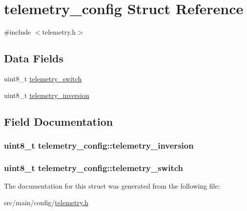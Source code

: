 \hypertarget{structtelemetry__config}{\section{telemetry\+\_\+config Struct Reference}
\label{structtelemetry__config}
}


{\ttfamily \#include $<$telemetry.\+h$>$}

\subsection*{Data Fields}
\begin{DoxyCompactItemize}
\item 
uint8\+\_\+t \hyperlink{structtelemetry__config_a3d927f7c7e93e090eb7d6d010faaad49}{telemetry\+\_\+switch}
\item 
uint8\+\_\+t \hyperlink{structtelemetry__config_a62928b06f0d19345d29e66a663c356ab}{telemetry\+\_\+inversion}
\end{DoxyCompactItemize}


\subsection{Field Documentation}
\hypertarget{structtelemetry__config_a62928b06f0d19345d29e66a663c356ab}{
\subsubsection[{telemetry\+\_\+inversion}]{\setlength{\rightskip}{0pt plus 5cm}uint8\+\_\+t telemetry\+\_\+config\+::telemetry\+\_\+inversion}}\label{structtelemetry__config_a62928b06f0d19345d29e66a663c356ab}
\hypertarget{structtelemetry__config_a3d927f7c7e93e090eb7d6d010faaad49}{
\subsubsection[{telemetry\+\_\+switch}]{\setlength{\rightskip}{0pt plus 5cm}uint8\+\_\+t telemetry\+\_\+config\+::telemetry\+\_\+switch}}\label{structtelemetry__config_a3d927f7c7e93e090eb7d6d010faaad49}


The documentation for this struct was generated from the following file\+:\begin{DoxyCompactItemize}
\item 
src/main/config/\hyperlink{config_2telemetry_8h}{telemetry.\+h}\end{DoxyCompactItemize}
